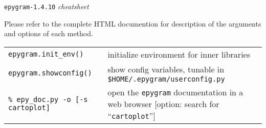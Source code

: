 \documentclass[a4paper,10pt]{article}
\date{\vspace{-1.5cm}}
\begin{document}
\huge
\begin{center}
\texttt{epygram-1.4.10} \textit{cheatsheet}
\end{center}
\normalsize

Please refer to the complete HTML documention for description of the arguments and options of each method.\\

\begin{tabular}{|p{9.5cm}|p{9.5cm}|}
\rowcolor{gray!50}
\multicolumn{2}{|c|}{\textbf{Miscellaneous}}\\
\hline
\texttt{epygram.init\_env()} & initialize environment for inner libraries\\
\texttt{epygram.showconfig()} & show config variables, tunable in \texttt{\$HOME/.epygram/userconfig.py}\\
\texttt{\% epy\_doc.py -o [-s cartoplot]} & open the \texttt{epygram} documentation in a web browser [option: search for ``\texttt{cartoplot}'']\\
\hline
\end{tabular}\\
\\

\end{document}
